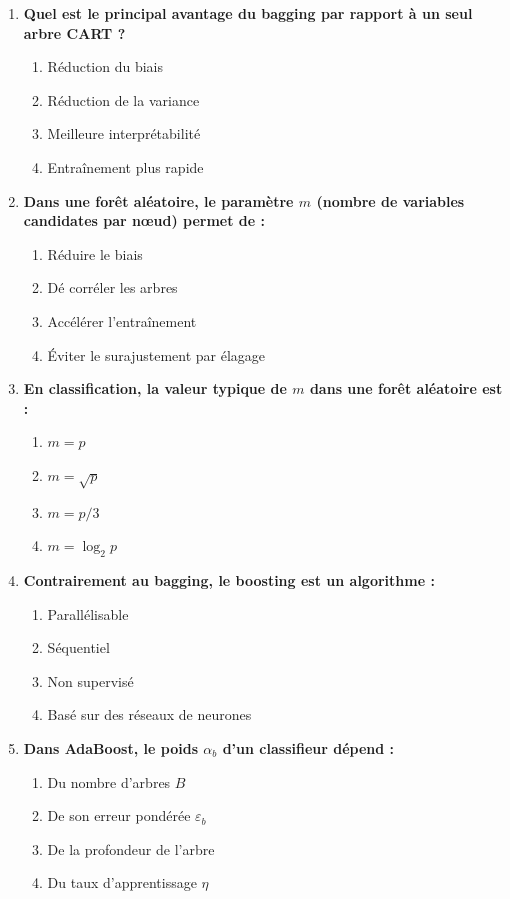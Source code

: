 \documentclass[a4paper,11pt]{article}
\begin{document}
\begin{enumerate}
    \item \textbf{Quel est le principal avantage du bagging par rapport à un seul arbre CART ?}
    \begin{enumerate}
        \item Réduction du biais
        \item Réduction de la variance
        \item Meilleure interprétabilité
        \item Entraînement plus rapide
    \end{enumerate}

    \item \textbf{Dans une forêt aléatoire, le paramètre $m$ (nombre de variables candidates par nœud) permet de :}
    \begin{enumerate}
        \item Réduire le biais
        \item Dé corréler les arbres
        \item Accélérer l'entraînement
        \item Éviter le surajustement par élagage
    \end{enumerate}

    \item \textbf{En classification, la valeur typique de $m$ dans une forêt aléatoire est :}
    \begin{enumerate}
        \item $m = p$
        \item $m = \sqrt{p}$
        \item $m = p/3$
        \item $m = \log_2 p$
    \end{enumerate}

    \item \textbf{Contrairement au bagging, le boosting est un algorithme :}
    \begin{enumerate}
        \item Parallélisable
        \item Séquentiel
        \item Non supervisé
        \item Basé sur des réseaux de neurones
    \end{enumerate}

    \item \textbf{Dans AdaBoost, le poids $\alpha_b$ d'un classifieur dépend :}
    \begin{enumerate}
        \item Du nombre d'arbres $B$
        \item De son erreur pondérée $\varepsilon_b$
        \item De la profondeur de l'arbre
        \item Du taux d'apprentissage $\eta$
    \end{enumerate}


\end{enumerate}
\end{document}
